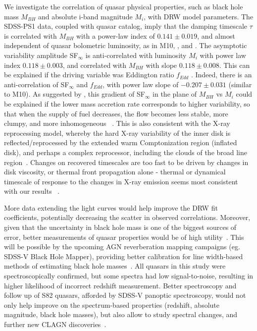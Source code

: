 \documentclass[twocolumn]{aastex62}
\begin{document}
We investigate the correlation of quasar physical properties, such as black hole mass $M_{BH}$ and absolute i-band magnitude $M_{i}$,  with DRW model parameters. The SDSS-PS1 data, coupled with \citet{shen2011} quasar catalog, imply that the damping timescale $\tau$  is correlated with $M_{BH}$ with a power-law index of $0.141 \pm 0.019$, and almost independent of quasar bolometric luminosity, as in M10, \citet{wilhite2008}, and \citet{vandenberk2004}. The asymptotic variability amplitude SF$_{\infty}$ is anti-correlated with luminosity $M_{i}$ with power law index $0.118\pm0.003$, and correlated with $M_{BH}$ with slope $0.118\pm 0.008$. This can be explained if the driving variable was Eddington ratio $f_{Edd}$ \citep{wilhite2008}. Indeed, there is an anti-correlation of SF$_{\infty}$ and $f_{Edd}$, with power law slope of $-0.207 \pm 0.031$ (similar to M10).  As suggested by \citet{kubota2018}, this gradient of SF$_{\infty}$ in the plane of $M_{BH}$ vs $M_{i}$ could be explained if the lower mass accretion rate corresponds to higher variability, so that when the supply of fuel decreases, the flow becomes less stable, more clumpy, and more inhomogeneous ~\citep{rakshit2017, kokubo2015, dexter2011}.  This is also consistent with the X-ray reprocessing model, whereby the hard X-ray variability of the inner disk is reflected/reprocessed by the extended warm Comptonization region (inflated disk), and perhaps a complex reprocessor, including the clouds of the broad line region~\citep{kubota2018, panda2019b}. Changes on recovered timescales are too fast to be driven by changes in disk viscosity, or thermal front propagation alone - thermal or dynamical timescale of response to the changes in X-ray emission seems most consistent with our results ~\citep{stern2018}.


More data extending the light curves would help improve the DRW fit coefficients, potentially decreasing the scatter in observed correlations. Moreover, given that the uncertainty in black hole mass is one of the biggest sources of error, better measurements of quasar properties would be of high utility~\citep{shen2011}.  This will be possible by the upcoming AGN reverberation mapping campaigns (eg. SDSS-V Black Hole Mapper), providing better calibration for line width-based methods of estimating black hole masses~\citep{kollmeier2017}. All quasars in this study were spectroscopically confirmed, but some spectra had low signal-to-noise, resulting in higher likelihood of incorrect redshift measurement. Better spectroscopy and follow up of S82 quasars, afforded by SDSS-V panoptic spectroscopy, would not only help improve on the spectrum-based  properties (redshift, absolute magnitude, black hole masses), but also allow to study spectral changes, and further new CLAGN discoveries~\citep{macleod2019}. 
\end{document}

